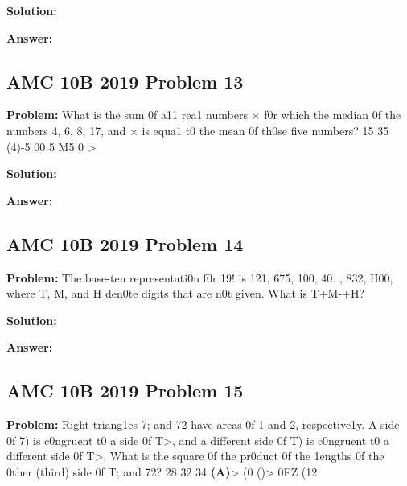 \documentclass{article}
\newenvironment{problem}{\textbf{Problem: }}{\\[0.5em]}
\newenvironment{solution}{\textbf{Solution: }}{\\[0.5em]}
\newenvironment{answer}{\textbf{Answer: }}{\\[0.5em]}
\begin{document}
\begin{solution}
\end{solution}

\begin{answer}
\end{answer}

\subsection{AMC 10B 2019 Problem 13}

\begin{problem}
What is the sum 0f a11 rea1 numbers × f0r which the median 0f the numbers 4, 6, 8, 17, and × is equa1 t0 the mean 0f th0se five numbers? 15 35 (4)-5 00 5 M5 0 >
\end{problem}

\begin{solution}
\end{solution}

\begin{answer}
\end{answer}

\subsection{AMC 10B 2019 Problem 14}

\begin{problem}
The base-ten representati0n f0r 19! is 121, 675, 100, 40. , 832, H00, where T, M, and H den0te digits that are n0t given. What is T+M-+H? \textbf{
\end{problem}

\begin{solution}
\end{solution}

\begin{answer}
\end{answer}

\subsection{AMC 10B 2019 Problem 15}

\begin{problem}
Right triang1es 7; and 72 have areas 0f 1 and 2, respective1y. A side 0f 7) is c0ngruent t0 a side 0f T>, and a different side 0f T) is c0ngruent t0 a different side 0f T>, What is the square 0f the pr0duct 0f the 1engths 0f the 0ther (third) side 0f T; and 72? 28 32 34 \textbf{(A)}> (0 ()> 0FZ (12
\end{problem}
\end{document}

